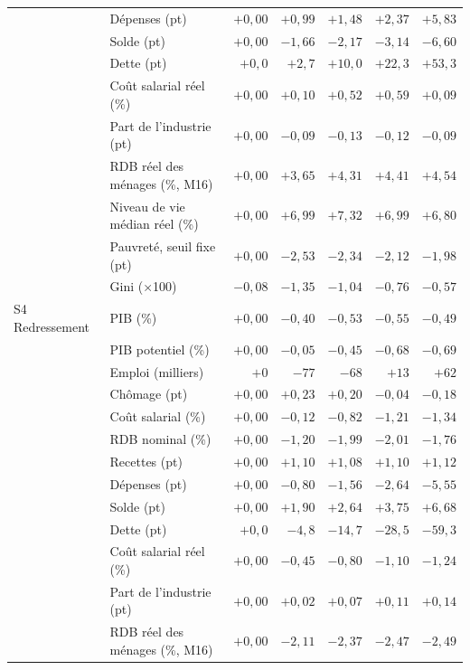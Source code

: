 \begin{longtable}{llrrrrr}
 & Dépenses (pt) & $+0{,}00$ & $+0{,}99$ & $+1{,}48$ & $+2{,}37$ & $+5{,}83$\\
 & Solde (pt) & $+0{,}00$ & $-1{,}66$ & $-2{,}17$ & $-3{,}14$ & $-6{,}60$\\
 & Dette (pt) & $+0{,}0$ & $+2{,}7$ & $+10{,}0$ & $+22{,}3$ & $+53{,}3$\\
 & Coût salarial réel (\%) & $+0{,}00$ & $+0{,}10$ & $+0{,}52$ & $+0{,}59$ & $+0{,}09$\\
 & Part de l'industrie (pt) & $+0{,}00$ & $-0{,}09$ & $-0{,}13$ & $-0{,}12$ & $-0{,}09$\\
 & RDB réel des ménages (\%, M16) & $+0{,}00$ & $+3{,}65$ & $+4{,}31$ & $+4{,}41$ & $+4{,}54$\\
 & Niveau de vie médian réel (\%) & $+0{,}00$ & $+6{,}99$ & $+7{,}32$ & $+6{,}99$ & $+6{,}80$\\
 & Pauvreté, seuil fixe (pt) & $+0{,}00$ & $-2{,}53$ & $-2{,}34$ & $-2{,}12$ & $-1{,}98$\\
 & Gini (×100) & $-0{,}08$ & $-1{,}35$ & $-1{,}04$ & $-0{,}76$ & $-0{,}57$\\
\addlinespace
S4 Redressement & PIB (\%) & $+0{,}00$ & $-0{,}40$ & $-0{,}53$ & $-0{,}55$ & $-0{,}49$\\
 & PIB potentiel (\%) & $+0{,}00$ & $-0{,}05$ & $-0{,}45$ & $-0{,}68$ & $-0{,}69$\\
 & Emploi (milliers) & $+0$ & $-77$ & $-68$ & $+13$ & $+62$\\
 & Chômage (pt) & $+0{,}00$ & $+0{,}23$ & $+0{,}20$ & $-0{,}04$ & $-0{,}18$\\
 & Coût salarial (\%) & $+0{,}00$ & $-0{,}12$ & $-0{,}82$ & $-1{,}21$ & $-1{,}34$\\
 & RDB nominal (\%) & $+0{,}00$ & $-1{,}20$ & $-1{,}99$ & $-2{,}01$ & $-1{,}76$\\
 & Recettes (pt) & $+0{,}00$ & $+1{,}10$ & $+1{,}08$ & $+1{,}10$ & $+1{,}12$\\
 & Dépenses (pt) & $+0{,}00$ & $-0{,}80$ & $-1{,}56$ & $-2{,}64$ & $-5{,}55$\\
 & Solde (pt) & $+0{,}00$ & $+1{,}90$ & $+2{,}64$ & $+3{,}75$ & $+6{,}68$\\
 & Dette (pt) & $+0{,}0$ & $-4{,}8$ & $-14{,}7$ & $-28{,}5$ & $-59{,}3$\\
 & Coût salarial réel (\%) & $+0{,}00$ & $-0{,}45$ & $-0{,}80$ & $-1{,}10$ & $-1{,}24$\\
 & Part de l'industrie (pt) & $+0{,}00$ & $+0{,}02$ & $+0{,}07$ & $+0{,}11$ & $+0{,}14$\\
 & RDB réel des ménages (\%, M16) & $+0{,}00$ & $-2{,}11$ & $-2{,}37$ & $-2{,}47$ & $-2{,}49$\\

\end{longtable}
